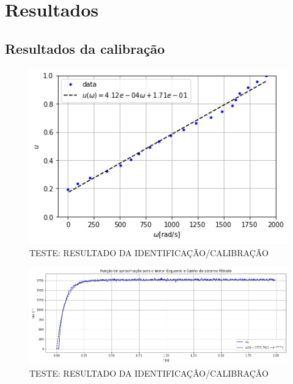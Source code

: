\chapter[Resultados]{Resultados}
\label{ch:resultados}



% 


\section{Resultados da calibração}

\begin{figure}[H]
    \centering
    \includegraphics[width=13cm]{figuras/resultados/plot_test_calibration_result_feedforward.png}
    \caption{TESTE: RESULTADO DA IDENTIFICAÇÃO/CALIBRAÇÃO}
\end{figure}

\begin{figure}[H]
    \centering
    \includegraphics[width=13cm]{figuras/resultados/plot_test_identificacao.png}
    \caption{TESTE: RESULTADO DA IDENTIFICAÇÃO/CALIBRAÇÃO}
\end{figure}

